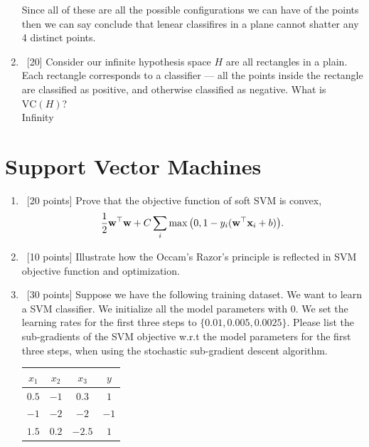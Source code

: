 \documentclass[12pt, fullpage,letterpaper]{article}
\DeclareMathOperator{\Hcal}{\mathcal{H}}
\begin{document}
\begin{enumerate}
    Since all of these are all the possible configurations we can have of the points then we can say conclude that
    lenear classifires in a plane cannot shatter any 4 distinct points.



\item~[20] Consider our infinite hypothesis space $H$ are all rectangles in a plain. Each rectangle corresponds to a classifier --- all the points inside the rectangle are classified as positive, and otherwise classified as negative. What is $\mathrm{VC}(H)$?\\
Infinity
\end{enumerate}

\section{Support Vector Machines}
\begin{enumerate}
\item~[20 points] Prove that the objective function of soft SVM is convex,
\[
\frac{1}{2}{\bf w}^\top{\bf w} + C\sum_{i} \max\big(0, 1 - y_i({\bf w}^\top{\bf x}_i+b)\big).
\]

\item~[10 points] Illustrate how the Occam's Razor's principle is reflected in SVM objective function and optimization. 


\item~[30 points] Suppose we have the following training dataset. We want to learn a SVM classifier. We initialize all the model parameters with $0$. We set the learning rates for the first three steps to $\{0.01, 0.005, 0.0025\}$.  Please list the sub-gradients of the SVM objective w.r.t the model parameters for the first three steps, when using the stochastic sub-gradient descent algorithm. 
\begin{table}[h]
        \centering
        \begin{tabular}{ccc|c}
        $x_1$ & $x_2$ & $x_3$ &  $y$\\ 
        \hline\hline
         $0.5$ & $-1$ & $0.3$ & $1$ \\ \hline
         $-1$ & $-2$ & $-2$ & $-1$\\ \hline
         $1.5$ & $0.2$ & $-2.5$ & $1$\\ \hline
        \end{tabular}
\end{table}

\end{enumerate}
\end{document}
